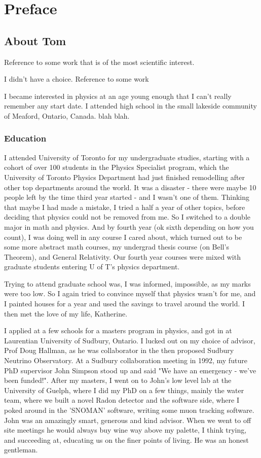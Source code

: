 \documentclass[../rzero]{subfiles}
\begin{document}
\chapter{Preface}

\section*{About Tom}
Reference to some work \cite{Andersen2019} that is of the most scientific interest.

I didn't have a choice.
Reference to some work \cite{Andersen2016}

I became interested in physics at an age young enough that I can't really remember any start date. I attended high school in the small lakeside community of Meaford, Ontario, Canada. blah blah.  

\subsection*{Education}
I attended University of Toronto for my undergraduate studies, starting with a cohort of over 100 students in the Physics Specialist program, which the University of Toronto Physics Department had just finished remodelling after other top departments around the world. It was a disaster - there were maybe 10 people left by the time third year started - and I wasn't one of them. Thinking that maybe I had made a mistake, I tried a half a year of other topics, before deciding that physics could not be removed from me. So I switched to a double major in math and physics. And by fourth year (ok sixth depending on how you count), I was doing well in any course I cared about, which turned out to be some more abstract math courses, my undergrad thesis course (on Bell's Theorem), and General Relativity. Our fourth year courses were mixed with graduate students entering U of T's physics department.  

Trying to attend graduate school was, I was informed, impossible, as my marks were too low. So I again tried to convince myself that physics wasn't for me, and I painted houses for a year and used the savings to travel around the world. I then met the love of my life, Katherine. 

I applied at a few schools for a masters program in physics, and got in at Laurentian University of Sudbury, Ontario. I lucked out on my choice of advisor, Prof Doug Hallman, as he was collaborator in the then proposed Sudbury Neutrino Observatory. At a Sudbury collaboration meeting in 1992, my future PhD supervisor John Simpson stood up and said "We have an emergency - we've been funded!". After my masters, I went on to John's low level lab at the University of Guelph, where I did my PhD on a few things, mainly the water team, where we built a novel Radon detector and the software side, where I poked around in the 'SNOMAN' software, writing some muon tracking software. John was an amazingly smart, generous and kind advisor. When we went to off site meetings he would always buy wine way above my palette, I think trying, and succeeding at, educating us on the finer points of living. He was an honest gentleman. 
\end{document}
